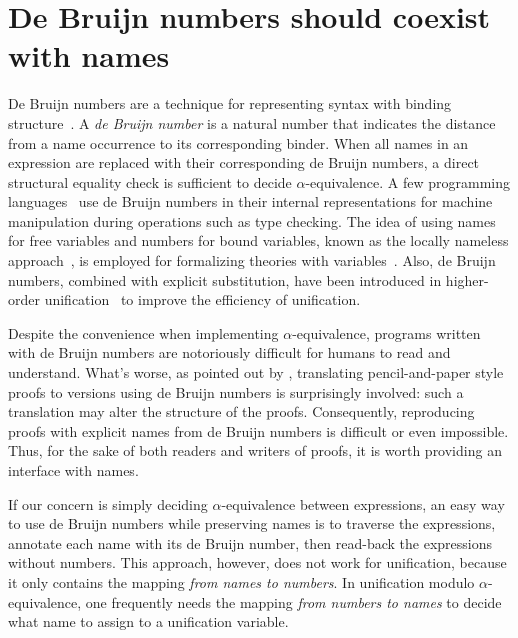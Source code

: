 \documentclass[a4paper,UKenglish]{lipics-v2016}
\begin{document}

\section{De Bruijn numbers should coexist with names}
\label{closures}


De Bruijn numbers are a technique for representing syntax with binding
structure~\citep{de_bruijn_lambda_1972}.  A \emph{de Bruijn number} is
a natural number that indicates the distance from a name occurrence to
its corresponding binder.  When all names in an expression are
replaced with their corresponding de Bruijn numbers, a direct
structural equality check is sufficient to decide
$\alpha$-equivalence.  A few programming
languages~\citep{norell_towards_2007} use de Bruijn numbers in their
internal representations for machine manipulation during operations
such as type checking.  The idea of using names for free variables and
numbers for bound variables, known as the locally nameless
approach~\citep{chargueraud_locally_2012}, is employed for formalizing
theories with variables~\citep{aydemir_nominal_2006,
  aydemir_engineering_2008}.  Also, de Bruijn numbers, combined with
explicit substitution, have been introduced in higher-order
unification~\citep{dowek_higher_2000} to improve the efficiency of
unification.

Despite the convenience when implementing $\alpha$-equivalence,
programs written with de Bruijn numbers are notoriously difficult for
humans to read and understand.  What's worse, as pointed out by
\citet{berghofer_head--head_2007}, translating pencil-and-paper style
proofs to versions using de Bruijn numbers is surprisingly involved:
such a translation may alter the structure of the proofs.
Consequently, reproducing proofs with explicit names from de Bruijn
numbers is difficult or even impossible.  Thus, for the sake of both
readers and writers of proofs, it is worth providing an interface with
names.

If our concern is simply deciding $\alpha$-equivalence between
expressions, an easy way to use de Bruijn numbers while preserving
names is to traverse the expressions, annotate each name with its de
Bruijn number, then read-back the expressions without numbers.  This
approach, however, does not work for unification, because it only
contains the mapping \emph{from names to numbers}.  In unification
modulo $\alpha$-equivalence, one frequently needs the mapping
\emph{from numbers to names} to decide what name to assign to a
unification variable.
\end{document}
